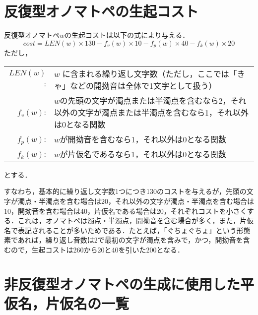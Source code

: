 \documentclass[japanese]{jnlp_1.4}
\begin{document}
 \section{反復型オノマトペの生起コスト}
 \label{APPEND::C}

 反復型オノマトペ$w$の生起コストは以下の式により与える．
 \[
  cost = LEN(w) \times 130 - f_v(w) \times 10 - f_p(w) \times 40 - f_k(w)
  \times 20
 \]
  ただし，

 \begin{tabular}{r@{\ }p{360pt}}
  $LEN(w)$:& $w$ に含まれる繰り返し文字数（ただし，ここでは「きゃ」などの開拗音は全体で1文字として扱う）\\
  $f_v(w)$:& $w$の先頭の文字が濁点または半濁点を含むなら2，それ以外の文字が濁点または半濁点を含むなら1，それ以外は0となる関数\\
  $f_p(w)$:& $w$が開拗音を含むなら1，それ以外は0となる関数\\
  $f_k(w)$:& $w$が片仮名であるなら1，それ以外は0となる関数
 \end{tabular}

\noindent
とする．

 すなわち，基本的に繰り返し文字数1つにつき130のコストを与えるが，先頭の文
 字が濁点・半濁点を含む場合は20，それ以外の文字が濁点・半濁点を含む場合は
 10，開拗音を含む場合は40，片仮名である場合は20，それぞれコストを小さくす
 る．これは，オノマトペは濁点・半濁点，開拗音を含む場合が多く，また，片仮
 名で表記されることが多いためである．たとえば，「ぐちょぐちょ」という形態
 素であれば，繰り返し音数は2で最初の文字が濁点を含みで，かつ，開拗音を含
 むので，生起コストは260から20と40を引いた200となる．

\clearpage
 \section{非反復型オノマトペの生成に使用した平仮名，片仮名の一覧}
 \label{APPEND::D}  

 \begin{table}[h]

 \end{table}
\end{document}
